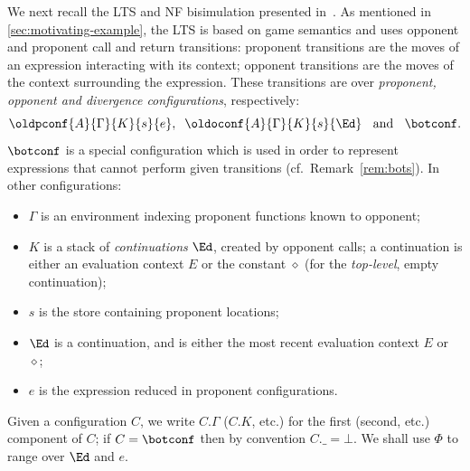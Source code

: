 We next recall the LTS and NF bisimulation presented in~\cite{KoutavasLT22}.
As mentioned in \cref{sec:motivating-example}, the LTS is based on game semantics and uses opponent and proponent call and return transitions:
proponent transitions are the moves of an expression interacting with its context;
opponent transitions are the moves of the context surrounding the expression.
These transitions are over \emph{proponent, opponent and divergence configurations}, respectively:
\[\oldpconf{A}{\Gamma}{K}{s}{e},\;\;\oldoconf{A}{\Gamma}{K}{s}{\Ed}
\;\;\text{ and }\;\;\botconf
  .\]
$\botconf$ is a special configuration which is used in order to represent expressions that cannot perform given transitions (cf.~Remark~\ref{rem:bots}).
In other configurations:
\begin{itemize}
  \item $\Gamma$ is an environment indexing proponent functions known to opponent;
  \item $K$ is a stack of \emph{continuations} $\Ed$, created by opponent calls; a {continuation} is either an {evaluation context $E$} or the constant $\diamond$ (for the \emph{top-level}, empty continuation);
  \item $s$ is the store containing proponent locations;
  \item $\Ed$ is a {continuation},
    and is either {the most recent evaluation context $E$} or $\diamond$;
  \item $e$ is the expression reduced in proponent configurations.
  \end{itemize}
Given a configuration $C$, we write $C.\Gamma$ ($C.K$, etc.) for the first  (second, etc.) component of $C$; if $C=\botconf$ then by convention $C.\_=\bot$.
We shall use $\Phi$ to range over $\Ed$ and $e$.

